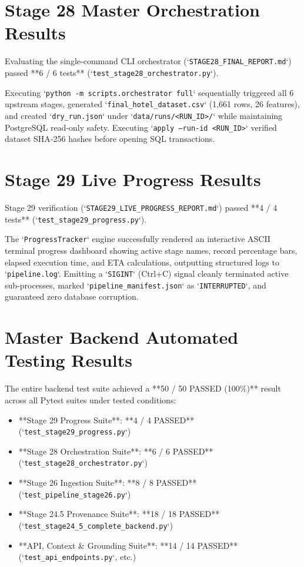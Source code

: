 \section{Stage 28 Master Orchestration Results}
Evaluating the single-command CLI orchestrator (`\texttt{STAGE28\_FINAL_REPORT.md}`) passed **6 / 6 tests** (`\texttt{test\_stage28\_orchestrator.py}`).

Executing `\texttt{python -m scripts.orchestrator full}` sequentially triggered all 6 upstream stages, generated `\texttt{final\_hotel\_dataset.csv}` (1,661 rows, 26 features), and created `\texttt{dry\_run.json}` under `\texttt{data/runs/<RUN\_ID>/}` while maintaining PostgreSQL read-only safety. Executing `\texttt{apply --run-id <RUN\_ID>}` verified dataset SHA-256 hashes before opening SQL transactions.

\section{Stage 29 Live Progress Results}
Stage 29 verification (`\texttt{STAGE29\_LIVE\_PROGRESS\_REPORT.md}`) passed **4 / 4 tests** (`\texttt{test\_stage29\_progress.py}`).

The `\texttt{ProgressTracker}` engine successfully rendered an interactive ASCII terminal progress dashboard showing active stage names, record percentage bars, elapsed execution time, and ETA calculations, outputting structured logs to `\texttt{pipeline.log}`. Emitting a `\texttt{SIGINT}` (Ctrl+C) signal cleanly terminated active sub-processes, marked `\texttt{pipeline\_manifest.json}` as `\texttt{INTERRUPTED}`, and guaranteed zero database corruption.

\section{Master Backend Automated Testing Results}
The entire backend test suite achieved a **50 / 50 PASSED (100\%)** result across all Pytest suites under tested conditions:
\begin{itemize}
    \item **Stage 29 Progress Suite**: **4 / 4 PASSED** (`\texttt{test\_stage29\_progress.py}`)
    \item **Stage 28 Orchestration Suite**: **6 / 6 PASSED** (`\texttt{test\_stage28\_orchestrator.py}`)
    \item **Stage 26 Ingestion Suite**: **8 / 8 PASSED** (`\texttt{test\_pipeline\_stage26.py}`)
    \item **Stage 24.5 Provenance Suite**: **18 / 18 PASSED** (`\texttt{test\_stage24\_5\_complete\_backend.py}`)
    \item **API, Context \& Grounding Suite**: **14 / 14 PASSED** (`\texttt{test\_api\_endpoints.py}`, etc.)
\end{itemize}

